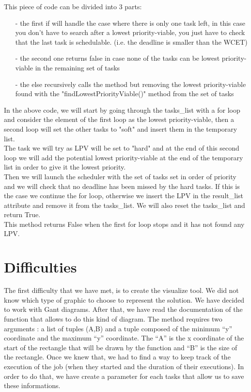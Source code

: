 \documentclass[a4paper,12pt]{article}
\begin{document}


\smallskip
\noindent
This piece of code can be divided into 3 parts: 

\begin{itemize}
  \item[-] the first if will handle the case where there is only one task left, in this case you don't have to search after a lowest priority-viable, you just have to check that the last task is schedulable. (i.e. the deadline is smaller than the WCET)
  \item[-] the second one returns false in case none of the tasks can be lowest priority-viable in the remaining set of tasks
  \item[-] the else recursively calls the method but removing the lowest priority-viable found with the "findLowestPriorityViable()" method from the set of tasks
\end{itemize}

\newpage


\smallskip
\noindent
In the above code, we will start by going through the tasks\_list with a for loop and consider the element of the first loop as the lowest priority-viable, then a second loop will set the other tasks to "soft" and insert them in the temporary list. \\
The task we will try as LPV will be set to "hard" and at the end of this second loop we will add the potential lowest priority-viable at the end of the temporary list in order to give it the lowest priority. \\
Then we will launch the scheduler with the set of tasks set in order of priority and we will check that no deadline has been missed by the hard tasks. If this is the case we continue the for loop, otherwise we insert the LPV in the result\_list attribute and remove it from the tasks\_list. We will also reset the tasks\_list and return True. \\
This method returns False when the first for loop stops and it has not found any LPV.
\newpage

\section{Difficulties}

The first difficulty that we have met, is to create the visualize tool. We did not know which type of graphic to choose to represent the solution. We have decided to work with Gant diagrams. After that, we have read the documentation of the function that allows to do this kind of diagram. The method requires two arguments : a list of tuples (A,B) and a tuple composed of the minimum ``y'' coordinate and the maximum ``y'' coordinate. The ``A'' is the x coordinate of the start of the rectangle that will be drawn by the function and ``B'' is the size of the rectangle. Once we knew that, we had to find a way to keep track of the execution of the job (when they started and the duration of their executions). In order to do that, we have create a parameter for each tasks that allow us to save these informations. \\
\end{document}
